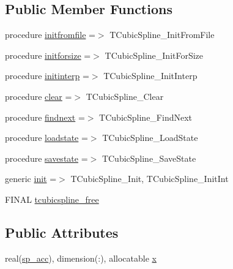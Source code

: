 \subsection*{Public Member Functions}
\begin{DoxyCompactItemize}
\item 
procedure \mbox{\hyperlink{structinterpolation_1_1tcubicspline_a92e6e3cecb6bf1a82d7f1b67d178d186}{initfromfile}} =$>$ T\+Cubic\+Spline\+\_\+\+Init\+From\+File
\item 
procedure \mbox{\hyperlink{structinterpolation_1_1tcubicspline_a2e569334f4f294099f2cd263641a98cb}{initforsize}} =$>$ T\+Cubic\+Spline\+\_\+\+Init\+For\+Size
\item 
procedure \mbox{\hyperlink{structinterpolation_1_1tcubicspline_a886429d2c9b5de59432625ce547452f8}{initinterp}} =$>$ T\+Cubic\+Spline\+\_\+\+Init\+Interp
\item 
procedure \mbox{\hyperlink{structinterpolation_1_1tcubicspline_a18dd913c3081a31e4f74b0ef9f31c35e}{clear}} =$>$ T\+Cubic\+Spline\+\_\+\+Clear
\item 
procedure \mbox{\hyperlink{structinterpolation_1_1tcubicspline_a8ab425acf85d48f32f0afddb70591940}{findnext}} =$>$ T\+Cubic\+Spline\+\_\+\+Find\+Next
\item 
procedure \mbox{\hyperlink{structinterpolation_1_1tcubicspline_a8c03db4ad775f77c96d636b618ad4fb3}{loadstate}} =$>$ T\+Cubic\+Spline\+\_\+\+Load\+State
\item 
procedure \mbox{\hyperlink{structinterpolation_1_1tcubicspline_adac7d657dae9359a060564099d356a41}{savestate}} =$>$ T\+Cubic\+Spline\+\_\+\+Save\+State
\item 
generic \mbox{\hyperlink{structinterpolation_1_1tcubicspline_a9634c89ee18748f7ec14a6c60434a643}{init}} =$>$ T\+Cubic\+Spline\+\_\+\+Init, T\+Cubic\+Spline\+\_\+\+Init\+Int
\item 
F\+I\+N\+AL \mbox{\hyperlink{structinterpolation_1_1tcubicspline_ab4de3dd4dec20d9bd54e7668989fe15e}{tcubicspline\+\_\+free}}
\end{DoxyCompactItemize}
\subsection*{Public Attributes}
\begin{DoxyCompactItemize}
\item 
real(\mbox{\hyperlink{namespaceinterpolation_af72aa9a05feb8ef90b2d26e4a013abf3}{sp\+\_\+acc}}), dimension(\+:), allocatable \mbox{\hyperlink{structinterpolation_1_1tcubicspline_a3ec1c46c2fe9e5a8ebd82edae749703e}{x}}
\end{DoxyCompactItemize}
